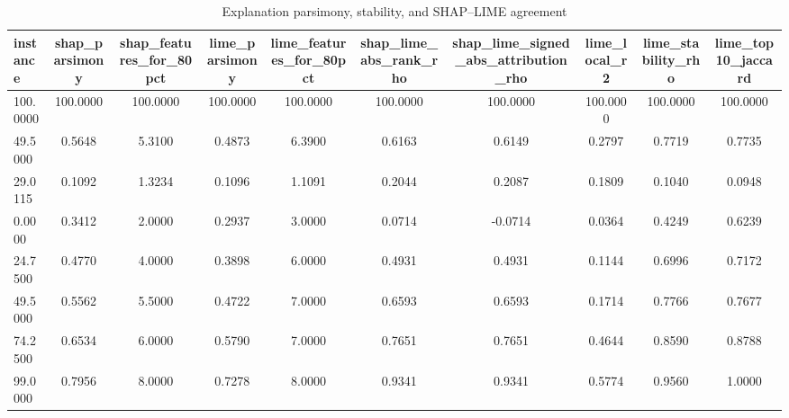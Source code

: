 \begin{table}
\centering
\caption{Explanation parsimony, stability, and SHAP--LIME agreement}
\label{tab:explanation_quality}
\begin{tabular}{lccccccccc}
\toprule
instance & shap_parsimony & shap_features_for_80pct & lime_parsimony & lime_features_for_80pct & shap_lime_abs_rank_rho & shap_lime_signed_abs_attribution_rho & lime_local_r2 & lime_stability_rho & lime_top10_jaccard \\
\midrule
100.0000 & 100.0000 & 100.0000 & 100.0000 & 100.0000 & 100.0000 & 100.0000 & 100.0000 & 100.0000 & 100.0000 \\
49.5000 & 0.5648 & 5.3100 & 0.4873 & 6.3900 & 0.6163 & 0.6149 & 0.2797 & 0.7719 & 0.7735 \\
29.0115 & 0.1092 & 1.3234 & 0.1096 & 1.1091 & 0.2044 & 0.2087 & 0.1809 & 0.1040 & 0.0948 \\
0.0000 & 0.3412 & 2.0000 & 0.2937 & 3.0000 & 0.0714 & -0.0714 & 0.0364 & 0.4249 & 0.6239 \\
24.7500 & 0.4770 & 4.0000 & 0.3898 & 6.0000 & 0.4931 & 0.4931 & 0.1144 & 0.6996 & 0.7172 \\
49.5000 & 0.5562 & 5.5000 & 0.4722 & 7.0000 & 0.6593 & 0.6593 & 0.1714 & 0.7766 & 0.7677 \\
74.2500 & 0.6534 & 6.0000 & 0.5790 & 7.0000 & 0.7651 & 0.7651 & 0.4644 & 0.8590 & 0.8788 \\
99.0000 & 0.7956 & 8.0000 & 0.7278 & 8.0000 & 0.9341 & 0.9341 & 0.5774 & 0.9560 & 1.0000 \\
\bottomrule
\end{tabular}
\end{table}
